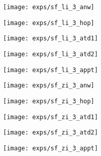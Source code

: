 \documentclass{USC-Thesis}
\numberwithin{equation}{chapter}
\begin{document}
\begin{figure*}[tbh]
	\begin{minipage}[b]{0.195\linewidth}
	\centering
		\texttt{[image: exps/sf\_li\_3\_anw]}
		\label{fig:sf_li_3_anw}
	\end{minipage}
	\begin{minipage}[b]{0.195\linewidth}
	\centering
		\texttt{[image: exps/sf\_li\_3\_hop]}
		\label{fig:sf_li_3_hop}
	\end{minipage}
	\begin{minipage}[b]{0.195\linewidth}
	\centering
		\texttt{[image: exps/sf\_li\_3\_atd1]}
		\label{fig:sf_li_3_atd1}
	\end{minipage}	
	\begin{minipage}[b]{0.195\linewidth}
	\centering
		\texttt{[image: exps/sf\_li\_3\_atd2]}
		\label{fig:sf_li_3_atd2}
	\end{minipage}
	\begin{minipage}[b]{0.195\linewidth}
		\centering
		\texttt{[image: exps/sf\_li\_3\_appt]}
		\label{fig:sf_li_3_appt}
	\end{minipage}

	\begin{minipage}[b]{0.195\linewidth}
	\centering
		\texttt{[image: exps/sf\_zi\_3\_anw]}
		\label{fig:sf_zi_3_anw}
	\end{minipage}
	\begin{minipage}[b]{0.195\linewidth}
	\centering
		\texttt{[image: exps/sf\_zi\_3\_hop]}
		\label{fig:sf_zi_3_hop}
	\end{minipage}
	\begin{minipage}[b]{0.195\linewidth}
	\centering
		\texttt{[image: exps/sf\_zi\_3\_atd1]}
		\label{fig:sf_zi_3_cell}
	\end{minipage}	
	\begin{minipage}[b]{0.195\linewidth}
	\centering
		\texttt{[image: exps/sf\_zi\_3\_atd2]}
		\label{fig:sf_zi_3_atd2}
	\end{minipage}
	\begin{minipage}[b]{0.195\linewidth}
		\centering
		\texttt{[image: exps/sf\_zi\_3\_appt]}
		\label{fig:sf_zi_3_appt}
	\end{minipage}


\end{figure*}
\end{document}
